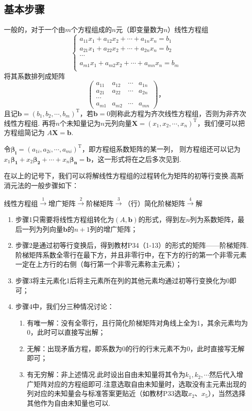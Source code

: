 \subsection{基本步骤}
一般的，对于一个由$m$个方程组成的$n$元（即变量数为$n$）线性方程组
$$\begin{cases}
	a_{11}x_1+a_{12}x_2+\cdots+a_{1n}x_n=b_1 \\
	a_{21}x_1+a_{22}x_2+\cdots+a_{2n}x_n=b_2 \\
	\cdots \\
	a_{m1}x_1+a_{m2}x_2+\cdots+a_{mn}x_n=b_m \\
\end{cases}$$
将其系数排列成矩阵
$$\begin{pmatrix}
	a_{11} & a_{12} & \cdots & a_{1n} \\
	a_{21} & a_{22} & \cdots & a_{2n} \\
	\cdots \\
	a_{m1} & a_{m2} & \cdots & a_{mn}
\end{pmatrix}，$$
且记$\bm{b}=(b_1,b_2,\cdots,b_m)^\mathrm{T}$，若$\bm{b}=0$则称此方程为齐次线性方程组，否则为非齐次线性方程组.
再将$n$个未知量记为$n$元列向量$\bm{X}=(x_1,x_2,\cdots,x_n)^\mathrm{T}$，我们便可以把方程组简记为
$A\bm{X}=\bm{b}$.

令$\bm{\beta_i}=(a_{1i},a_{2i},\cdots,a_{mi})^\mathrm{T}$，即方程组系数矩阵的某一列，
则方程组还可以记为$x_1\bm{\beta_1}+x_2\bm{\beta_2}+\cdots+x_n\bm{\beta_n}=\bm{b}$，这一形式将在之后多次见到.

在以上的记号下，我们可以将解线性方程组的过程转化为矩阵的初等行变换.高斯消元法的一般步骤如下：

\centerline{线性方程组$\overset{1}{\longrightarrow}$增广矩阵$\overset{2}{\longrightarrow}$阶梯矩阵$\overset{3}{\longrightarrow}$（行）简化阶梯矩阵$\overset{4}{\longrightarrow}$解}

\begin{enumerate}
	\item 步骤1只需要将线性方程组转化为$(A, \bm{b})$的形式，得到左$n$列为系数矩阵，最后一列为列向量$\bm{b}$的$n+1$列的增广矩阵；
	\item 步骤2是通过初等行变换后，得到教材P34（1-13）的形式的矩阵——阶梯矩阵.阶梯矩阵系数全零行在最下方，并且非零行中，在下方的行的第一个非零元素一定在上方行的右侧（每行第一个非零元素称主元素）；
	\item 步骤3将主元素化1后将主元素所在列的其他元素均通过初等行变换化为0即可；
	\item 步骤4中，我们分三种情况讨论：
	\begin{enumerate}
		\item 有唯一解：没有全零行，且行简化阶梯矩阵对角线上全为1，其余元素均为0，此时可以直接写出解；
		\item 无解：出现矛盾方程，即系数为0的行的行末元素不为0，此时直接写无解即可；
		\item 有无穷解：非上述情况.此时设出自由未知量将其令为$k_1,k_2,\cdots$然后代入增广矩阵对应的方程组即可.注意选取自由未知量时，选取没有主元素出现的列对应的未知量会与标准答案更贴近（如教材P33选取$x_2$、$x_5$），当然选择其他作为自由未知量也可以.
	\end{enumerate}
\end{enumerate}

